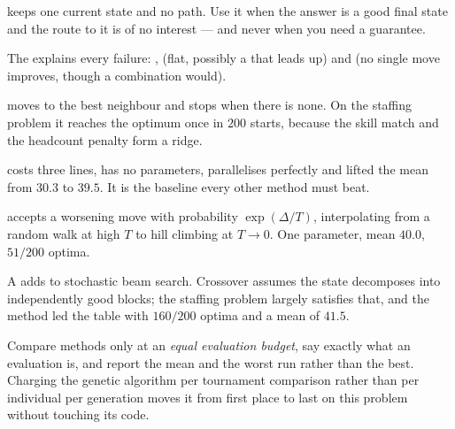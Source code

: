 \begin{chaptersummary}
\begin{tight}
  \item {} keeps one current state and no path. Use it when the
        answer is a good final state and the route to it is of no interest --- and
        never when you need a guarantee.
  \item The  explains every failure: ,  (flat, possibly a  that leads up)
        and  (no single move improves, though a combination would).
  \item {} moves to the best neighbour and stops when there is
        none. On the staffing problem it reaches the optimum once in $200$ starts,
        because the skill match and the headcount penalty form a ridge.
  \item {} costs three lines, has no parameters, parallelises
        perfectly and lifted the mean from $30.3$ to $39.5$. It is the baseline
        every other method must beat.
  \item {} accepts a worsening move with probability
        $\exp(\Delta/T)$, interpolating from a random walk at high $T$ to hill
        climbing at $T \to 0$. One parameter, mean $40.0$, $51/200$ optima.
  \item A  adds  to stochastic beam search.
        Crossover assumes the state decomposes into independently good blocks; the
        staffing problem largely satisfies that, and the method led the table with
        $160/200$ optima and a mean of $41.5$.
  \item Compare methods only at an \emph{equal evaluation budget}, say exactly what
        an evaluation is, and report the mean and the worst run rather than the best.
        Charging the genetic algorithm per tournament comparison rather than per
        individual per generation moves it from first place to last on this problem
        without touching its code.
\end{tight}
\end{chaptersummary}

